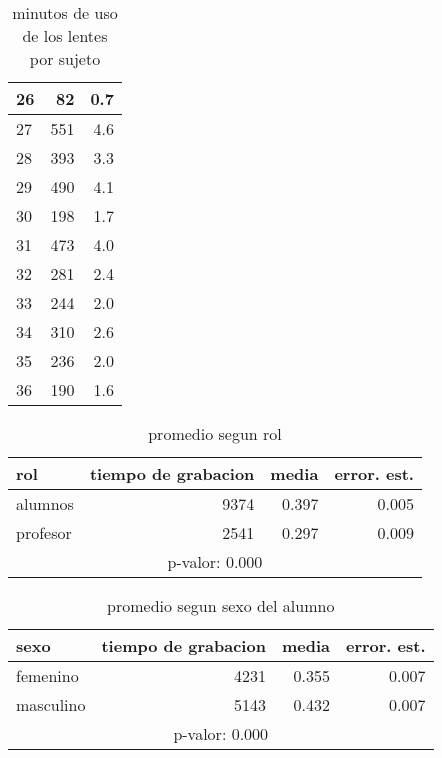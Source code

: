 \documentclass[spanish]{article}
\begin{document}
\begin{table}[h!]
\begin{center}
\begin{tabular}{|l|r|r|}
    26 &               82 &            0.7\\ \hline
    27 &              551 &            4.6\\ \hline
    28 &              393 &            3.3\\ \hline
    29 &              490 &            4.1\\ \hline
    30 &              198 &            1.7\\ \hline
    31 &              473 &            4.0\\ \hline
    32 &              281 &            2.4\\ \hline
    33 &              244 &            2.0\\ \hline
    34 &              310 &            2.6\\ \hline
    35 &              236 &            2.0\\ \hline
    36 &              190 &            1.6\\ \hline
\end{tabular}
\caption{minutos de uso de los lentes por sujeto}
\end{center}
\end{table}

\begin{table}[h!]
\begin{center}
\begin{tabular}{|l|r|r|r|}
\hline
rol      & tiempo de grabacion & media          & error. est.     \\ \hline
alumnos  &                9374 &          0.397 &            0.005\\ \hline
profesor &                2541 &          0.297 &            0.009\\ \hline
\multicolumn{4}{|c|}{p-valor: 0.000} \\ \hline
\end{tabular}
\caption{promedio segun rol}
\end{center}
\end{table}

\begin{table}[h!]
\begin{center}
\begin{tabular}{|l|r|r|r|}
\hline
sexo      & tiempo de grabacion & media          & error. est.     \\ \hline
femenino  &                4231 &          0.355 &            0.007\\ \hline
masculino &                5143 &          0.432 &            0.007\\ \hline
\multicolumn{4}{|c|}{p-valor: 0.000} \\ \hline
\end{tabular}
\caption{promedio segun sexo del alumno}
\end{center}
\end{table}
\end{document}

